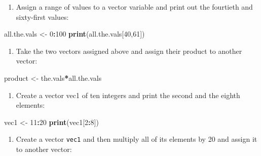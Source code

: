 \documentclass[
]{book}
\newenvironment{Shaded}{\begin{snugshade}}{\end{snugshade}}
\newcommand{\DecValTok}[1]{\textcolor[rgb]{0.00,0.00,0.81}{#1}}
\newcommand{\KeywordTok}[1]{\textcolor[rgb]{0.13,0.29,0.53}{\textbf{#1}}}
\newcommand{\NormalTok}[1]{#1}
\newcommand{\OperatorTok}[1]{\textcolor[rgb]{0.81,0.36,0.00}{\textbf{#1}}}
\newcommand{\StringTok}[1]{\textcolor[rgb]{0.31,0.60,0.02}{#1}}
\providecommand{\tightlist}{%
  \setlength{\itemsep}{0pt}\setlength{\parskip}{0pt}}
\theoremstyle{definition}
\theoremstyle{definition}
\theoremstyle{definition}
\theoremstyle{remark}
\begin{document}
\begin{enumerate}
\def\labelenumi{\arabic{enumi}.}
\setcounter{enumi}{2}
\tightlist
\item
  Assign a range of values to a vector variable and print out the fourtieth and sixty-first values:
\end{enumerate}

\begin{Shaded}
\begin{Highlighting}[]
\NormalTok{all.the.vals \textless{}{-}}\StringTok{ }\DecValTok{0}\OperatorTok{:}\DecValTok{100}
\KeywordTok{print}\NormalTok{(all.the.vals[}\DecValTok{40}\NormalTok{,}\DecValTok{61}\NormalTok{])}
\end{Highlighting}
\end{Shaded}

\begin{enumerate}
\def\labelenumi{\arabic{enumi}.}
\setcounter{enumi}{3}
\tightlist
\item
  Take the two vectors assigned above and assign their product to another vector:
\end{enumerate}

\begin{Shaded}
\begin{Highlighting}[]
\NormalTok{product \textless{}{-}}\StringTok{ }\NormalTok{the.vals}\OperatorTok{*}\NormalTok{all.the.vals}
\end{Highlighting}
\end{Shaded}

\begin{enumerate}
\def\labelenumi{\arabic{enumi}.}
\setcounter{enumi}{4}
\tightlist
\item
  Create a vector vec1 of ten integers and print the second and the eighth elements:
\end{enumerate}

\begin{Shaded}
\begin{Highlighting}[]
\NormalTok{vec1 \textless{}{-}}\StringTok{ }\DecValTok{11}\OperatorTok{:}\DecValTok{20} 
\KeywordTok{print}\NormalTok{(vec1[}\DecValTok{2}\OperatorTok{:}\DecValTok{8}\NormalTok{])}
\end{Highlighting}
\end{Shaded}

\begin{enumerate}
\def\labelenumi{\arabic{enumi}.}
\setcounter{enumi}{5}
\tightlist
\item
  Create a vector \texttt{vec1} and then multiply all of its elements by 20 and assign it to another vector:
\end{enumerate}
\end{document}
